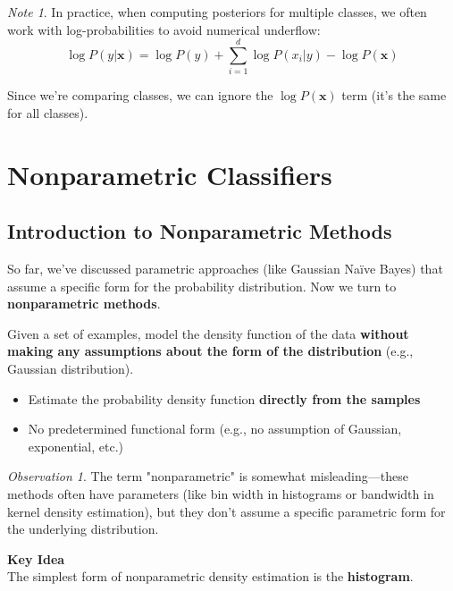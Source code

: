 \documentclass[11pt,a4paper]{article}
\theoremstyle{definition}
\theoremstyle{plain}
\theoremstyle{remark}
\newtheorem*{remark}{Note}
\newtheorem*{observation}{Observation}
\begin{document}
\begin{remark}
In practice, when computing posteriors for multiple classes, we often work with log-probabilities to avoid numerical underflow:
\[
\log P(y | \mathbf{x}) = \log P(y) + \sum_{i=1}^{d} \log P(x_i | y) - \log P(\mathbf{x})
\]

Since we're comparing classes, we can ignore the $\log P(\mathbf{x})$ term (it's the same for all classes).
\end{remark}

\section{Nonparametric Classifiers}

\subsection{Introduction to Nonparametric Methods}

So far, we've discussed parametric approaches (like Gaussian Naïve Bayes) that assume a specific form for the probability distribution. Now we turn to \textbf{nonparametric methods}.

\begin{tcolorbox}[colback=purple!5!white,colframe=purple!75!black,title=\textbf{Nonparametric Methods}]
Given a set of examples, model the density function of the data \textbf{without making any assumptions about the form of the distribution} (e.g., Gaussian distribution).

\begin{itemize}
    \item Estimate the probability density function \textbf{directly from the samples}
    \item No predetermined functional form (e.g., no assumption of Gaussian, exponential, etc.)
\end{itemize}
\end{tcolorbox}

\begin{observation}
The term "nonparametric" is somewhat misleading—these methods often have parameters (like bin width in histograms or bandwidth in kernel density estimation), but they don't assume a specific parametric form for the underlying distribution.
\end{observation}

\begin{center}
\colorbox{orange!15}{\parbox{0.9\textwidth}{
\centering
\textbf{Key Idea}\\[0.2cm]
The simplest form of nonparametric density estimation is the \textbf{histogram}.
}}
\end{center}
\end{document}
